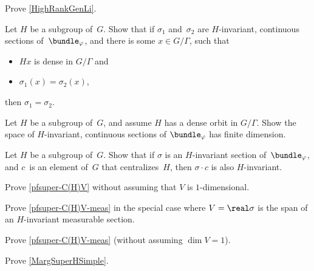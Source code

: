 \begin{exercises}
\item \label{HighRankGenLiEx}
Prove \cref{HighRankGenLi}.

\item \label{InvtSectDetPtEx}
Let $H$ be a subgroup of~$G$. Show that if $\sigma_1$ and~$\sigma_2$ are $H$-invariant, continuous sections of~$\bundle_\varphi$, and there is some $x \in G/\Gamma$, such that
	\begin{itemize}
	\item $Hx$ is dense in $G/\Gamma$
	and
	\item $\sigma_1(x) = \sigma_2(x)$,
	\end{itemize}
then $\sigma_1 = \sigma_2$.

\item \label{InvtSectFDEx}
Let $H$ be a subgroup of~$G$, and assume $H$ has a dense orbit in $G/\Gamma$. Show the space of $H$-invariant, continuous sections of $\bundle_\varphi$ has finite dimension.

\item \label{CG(H).HInvtEx}
Let $H$ be a subgroup of~$G$. Show that if $\sigma$ is an $H$-invariant section of~$\bundle_\varphi$, and $c$~is an element of~$G$ that centralizes~$H$, then $\sigma \cdot c$ is also $H$-invariant.

\item \label{pfsuper-C(H)VEx}
Prove \cref{pfsuper-C(H)V} without assuming that $V$ is $1$-dimensional.

\item \label{pfsuper-C(H)V-measPfEx}
Prove \cref{pfsuper-C(H)V-meas} in the special case where $V = \real \sigma$ is the span of an $H$-invariant measurable section.

\item \label{pfsuper-C(H)V-measFullPfEx}
Prove \cref{pfsuper-C(H)V-meas} (without assuming $\dim V = 1$).

\item \label{ProveMargSuperHSimpleEx}
Prove \cref{MargSuperHSimple}.

\end{exercises}








